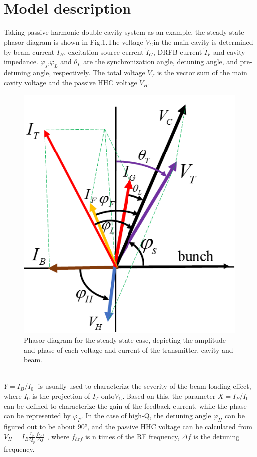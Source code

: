 \documentclass[letterpaper,
               nospread,     %
               ]{jacow}
\begin{document}
\section{Model description}
Taking passive harmonic double cavity system as an example,
the steady-state phasor diagram is shown in Fig.1.The
voltage ${{\tilde{V}}_{C}}$in the main cavity is determined
by beam current ${{\tilde{I}}_{B}}$, excitation source current
$\tilde{I}_{G}^{{}}$, DRFB current $\tilde{I}_{F}^{{}}$ and
cavity impedance. ${{\varphi }_{s}}$,${{\varphi }_{L}}$ and ${{\theta }_{L}}$
are the synchronization angle, detuning angle, and pre-detuning angle, respectively.
The total voltage ${{\tilde{V}}_{T}}$ is the vector sum of the
main cavity voltage and the passive HHC voltage ${{\tilde{V}}_{H}}$.
\begin{figure}[!htb]
   \centering
   \includegraphics*[width=.5\columnwidth]{THPA037_f1}
   \caption{Phasor diagram for the steady-state case,
      depicting the amplitude and phase of each voltage
      and current of the transmitter, cavity and beam.}
   \label{fig:paper_layout}
\end{figure}
\\
\hspace*{1em}$Y={{{I}_{B}}}/{{{I}_{0}}}\;$ is usually
used to characterize the severity of the beam loading effect, where
${{I}_{0}}$ is the projection of ${{I}_{T}}$ onto${{V}_{C}}$. Based
on this, the parameter $X={{{I}_{F}}}/{{{I}_{0}}}\;$
can be defined to characterize the gain of the feedback current,
while the phase can be represented by ${{\varphi }_{F}}$.
In the case of high-Q, the detuning angle ${{\varphi }_{H}}$
can be figured out to be about 90°, and the passive HHC voltage can be calculated from
${{V}_{H}}={{I}_{B}}\frac{{{r}_{p}}}{{{Q}_{p}}}\frac{{{f}_{hrf}}}{\Delta f}$
\cite{ref7}, where ${{f}_{hrf}}$
is n times of the RF frequency, ${\Delta f}$ is the detuning frequency.
\end{document}
